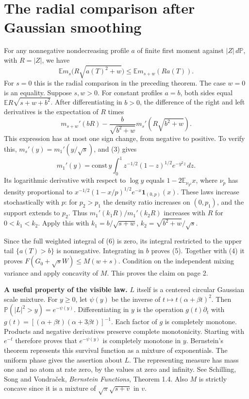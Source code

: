 \documentclass[11pt]{article}
\newcommand{\E}{\mathbb E}
\newcommand{\PP}{\mathbb P}
\newcommand{\dd}{\,d}
\newcommand{\ind}{\mathbf 1}
\newcommand{\head}[1]{\section*{#1}}
\begin{document}
\newpage
\head{The radial comparison after Gaussian smoothing}
For any nonnegative nondecreasing profile \(a\) of finite first moment
against \(|Z|\,d\PP\), with \(R=|Z|\), we have
\[
 \E m_s\bigl(R\sqrt{a(T)^2+w}\bigr)\le \E m_{s+w}(Ra(T)).                 \tag{5}
\]
For \(s=0\) this is the radial comparison in the preceding theorem. The case
\(w=0\) is an equality. Suppose \(s,w>0\). For constant profiles \(a=b\),
both sides equal \(\E R\sqrt{s+w+b^2}\). After differentiating in \(b>0\),
the difference of the right and left derivatives is the expectation of \(R\) times
\[
 m_{s+w}'(bR)-\frac b{\sqrt{b^2+w}}m_s'(R\sqrt{b^2+w}).                  \tag{6}
\]
This expression has at most one sign change, from negative to positive.
To verify this, \(m_s'(y)=m_1'(y/\sqrt s)\), and (3) gives
\[
 m_1'(y)=\mathrm{const}\, y\int_0^1 z^{-1/2}(1-z)^{1/2} e^{-y^2z}\dd z .
\]
Its logarithmic derivative with respect to \(\log y\) equals \(1-2\E_{\nu_{y^2}}x\),
where \(\nu_p\) has density proportional to
\(x^{-1/2}(1-x/p)^{1/2}e^{-x}\ind_{(0,p)}(x)\).
These laws increase stochastically with \(p\): for \(p_2>p_1\) the density
ratio increases on \((0,p_1)\), and the support extends to \(p_2\).
Thus \(m_1'(k_1R)/m_1'(k_2R)\) increases with \(R\) for \(0<k_1<k_2\).
Apply this with \(k_1=b/\sqrt{s+w}\), \(k_2=\sqrt{b^2+w}/\sqrt s\).

Since the full weighted integral of (6) is zero, its integral restricted to the
upper tail \(\{a(T)>b\}\) is nonnegative. Integrating in \(b\) proves (5).
Together with (4) it proves \(F(G_0+\sqrt s W)\le M(w+s)\).
Condition on the independent mixing variance and apply concavity of \(M\).
This proves the claim on page 2.

\textbf{A useful property of the visible law.} \(L\) itself is a centered
circular Gaussian scale mixture. For \(y\ge0\), let \(\psi(y)\) be the inverse of
\(t\mapsto t(\alpha+\beta t)^2\). Then \(\PP(|L|^2>y)=e^{-\psi(y)}\).
Differentiating in \(y\) is the operation \(g(t)\partial_t\) with
\(g(t)=[(\alpha+\beta t)(\alpha+3\beta t)]^{-1}\). Each factor of \(g\) is completely
monotone. Products and negative derivatives preserve complete monotonicity.
Starting with \(e^{-t}\) therefore proves that \(e^{-\psi(y)}\) is completely
monotone in \(y\). Bernstein's theorem represents this survival function as a
mixture of exponentials. The uniform phase gives the assertion about \(L\).
The representing measure has mass one and no atom at rate zero, by the values
at zero and infinity. See Schilling, Song and Vondra\v cek, \emph{Bernstein Functions},
Theorem 1.4. Also \(M\) is strictly concave since it is a mixture of
\(\sqrt\pi\sqrt{s+v}\) in \(v\).
\end{document}
